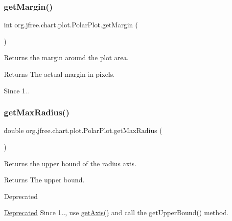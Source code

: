 \subsubsection{\texorpdfstring{get\+Margin()}{getMargin()}}
{\footnotesize\ttfamily int org.\+jfree.\+chart.\+plot.\+Polar\+Plot.\+get\+Margin (\begin{DoxyParamCaption}{ }\end{DoxyParamCaption})}

Returns the margin around the plot area.

\begin{DoxyReturn}{Returns}
The actual margin in pixels.
\end{DoxyReturn}
\begin{DoxySince}{Since}
1.. 
\end{DoxySince}
\mbox{\label{classorg_1_1jfree_1_1chart_1_1plot_1_1_polar_plot_aac49cc51c62963418b44ea916f1de925}} 
\subsubsection{\texorpdfstring{get\+Max\+Radius()}{getMaxRadius()}}
{\footnotesize\ttfamily double org.\+jfree.\+chart.\+plot.\+Polar\+Plot.\+get\+Max\+Radius (\begin{DoxyParamCaption}{ }\end{DoxyParamCaption})}

Returns the upper bound of the radius axis.

\begin{DoxyReturn}{Returns}
The upper bound.
\end{DoxyReturn}
\begin{DoxyRefDesc}{Deprecated}
\item[\mbox{\hyperlink{deprecated__deprecated000081}{Deprecated}}]Since 1.., use \mbox{\hyperlink{classorg_1_1jfree_1_1chart_1_1plot_1_1_polar_plot_aa23feb5967de898ada3d412c9d614825}{get\+Axis()}} and call the get\+Upper\+Bound() method. \end{DoxyRefDesc}
\mbox{\label{classorg_1_1jfree_1_1chart_1_1plot_1_1_polar_plot_a07f4e721ab3798eef43b7401d54808f7}} 
